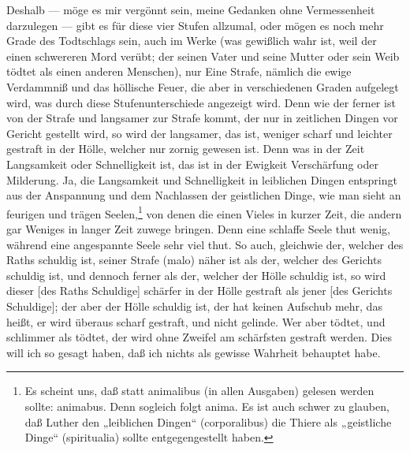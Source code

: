 Deshalb — möge es mir vergönnt sein, meine Gedanken ohne Vermessenheit darzulegen — gibt es für diese vier Stufen allzumal, oder mögen es noch mehr Grade des Todtschlags sein, auch im Werke (was gewißlich wahr ist, weil der einen schwereren Mord verübt; der seinen Vater und seine Mutter oder sein Weib tödtet als einen anderen Menschen), nur Eine Strafe, nämlich die ewige Verdammniß und das höllische Feuer, die aber in verschiedenen Graden aufgelegt wird, was durch diese Stufenunterschiede angezeigt wird. Denn wie der ferner ist von der Strafe und langsamer zur Strafe kommt, der nur in zeitlichen Dingen vor Gericht gestellt wird, so wird der langsamer, das ist, weniger scharf und leichter gestraft in der Hölle, welcher nur zornig gewesen ist. Denn was in der Zeit Langsamkeit oder Schnelligkeit ist, das ist in der Ewigkeit Verschärfung oder Milderung. Ja, die Langsamkeit und Schnelligkeit in leiblichen Dingen entspringt aus der Anspannung und dem Nachlassen der geistlichen Dinge, wie man sieht an feurigen und trägen Seelen,\footnote{Es scheint uns, daß statt animalibus (in allen Ausgaben) gelesen werden sollte: animabus. Denn sogleich folgt anima. Es ist auch schwer zu glauben, daß Luther den „leiblichen Dingen“ (corporalibus) die Thiere als „geistliche Dinge“ (spiritualia) sollte entgegengestellt haben.} von denen die einen Vieles in kurzer Zeit, die andern gar Weniges in langer Zeit zuwege bringen. Denn eine schlaffe Seele thut wenig, während eine angespannte Seele sehr viel thut. So auch, gleichwie der, welcher des Raths schuldig ist, seiner Strafe (malo) näher ist als der, welcher des Gerichts schuldig ist, und dennoch ferner als der, welcher der Hölle schuldig ist, so wird dieser
[des Raths Schuldige] schärfer in der Hölle gestraft als jener [des Gerichts Schuldige]; der aber der Hölle schuldig ist, der hat keinen Aufschub mehr, das heißt, er wird überaus scharf gestraft, und nicht gelinde. Wer aber tödtet, und schlimmer als tödtet, der wird ohne Zweifel am schärfsten gestraft werden. Dies will ich so gesagt haben, daß ich nichts als gewisse Wahrheit behauptet habe.

